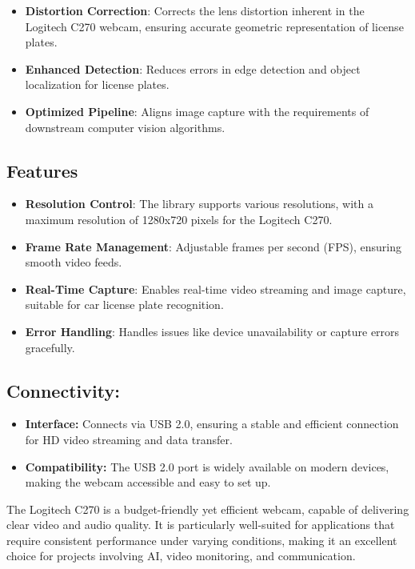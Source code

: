 \begin{itemize}
	\item \textbf{Distortion Correction}: Corrects the lens distortion inherent in the Logitech C270 webcam, ensuring accurate geometric representation of license plates.
	\item \textbf{Enhanced Detection}: Reduces errors in edge detection and object localization for license plates.
	\item \textbf{Optimized Pipeline}: Aligns image capture with the requirements of downstream computer vision algorithms. \cite{Stokman:2020}
	
\end{itemize}

\subsection{Features}

\begin{itemize}
	\item \textbf{Resolution Control}: The library supports various resolutions, with a maximum resolution of 1280x720 pixels for the Logitech C270.
	\item \textbf{Frame Rate Management}: Adjustable frames per second (FPS), ensuring smooth video feeds.
	\item \textbf{Real-Time Capture}: Enables real-time video streaming and image capture, suitable for car license plate recognition.
	\item \textbf{Error Handling}: Handles issues like device unavailability or capture errors gracefully.
\end{itemize}

\subsection{Connectivity:}
\begin{itemize}
	\item \textbf{Interface:} Connects via USB 2.0, ensuring a stable and efficient connection for HD video streaming and data transfer.
	
	\item \textbf{Compatibility:} The USB 2.0 port is widely available on modern devices, making the webcam accessible and easy to set up.
\end{itemize}

The Logitech C270 is a budget-friendly yet efficient webcam, capable of delivering clear video and audio quality. It is particularly well-suited for applications that require consistent performance under varying conditions, making it an excellent choice for projects involving AI, video monitoring, and communication.



